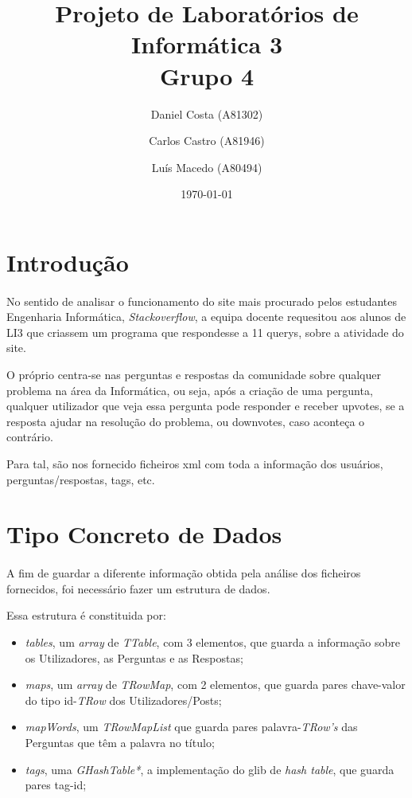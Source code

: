 \documentclass[a4paper, 10pt]{article}
\title{Projeto de Laboratórios de Informática 3\\Grupo 4}
\author{Daniel Costa (A81302) \and Carlos Castro (A81946) \and Luís Macedo (A80494)}
\date{\today}
\begin{document}
\maketitle

\section{Introdução}
\label{sec:intro}

\paragraph{ }
No sentido de analisar o funcionamento do site mais procurado pelos
estudantes Engenharia Informática, \emph{Stackoverflow}, a equipa docente
requesitou aos alunos de LI3 que criassem um programa que respondesse
a 11 querys, sobre a atividade do site.

O próprio centra-se nas perguntas e respostas da comunidade sobre qualquer problema na área da Informática, ou seja, após a criação de uma pergunta, qualquer utilizador que veja essa pergunta pode responder e receber upvotes, se a resposta ajudar na resolução do problema, ou downvotes, caso aconteça o contrário.

Para tal, são nos fornecido ficheiros xml com toda a informação dos usuários, perguntas/respostas, tags, etc.

\section{Tipo Concreto de Dados}
\label{sec:TCD}

\paragraph{ }

A fim de guardar a diferente informação obtida pela análise dos ficheiros fornecidos, foi necessário fazer um estrutura de dados.

Essa estrutura é constituida por:
\begin{itemize}
	\item \emph{tables}, um \emph{array} de \emph{TTable}, com 3 elementos, que guarda a informação sobre os Utilizadores, as Perguntas e as Respostas;
	\item \emph{maps}, um \emph{array} de \emph{TRowMap}, com 2 elementos, que guarda pares chave-valor do tipo id-\emph{TRow} dos Utilizadores/Posts;
	\item \emph{mapWords}, um \emph{TRowMapList} que guarda pares palavra-\emph{TRow's} das Perguntas que têm a palavra no título;
	\item \emph{tags}, uma \emph{GHashTable*}, a implementação do glib de \emph{hash table}, que guarda pares tag-id;
\end{itemize}
\end{document}
